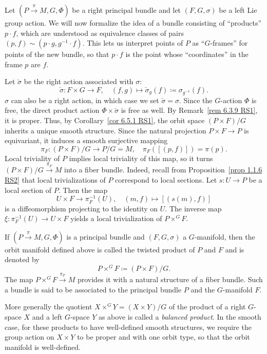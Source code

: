 Let $(P\overset{\pi}{\to}M,G,\Phi)$ be a right principal bundle and let $(F,G,\sigma)$ be a left Lie group action. We will now formalize the idea of a bundle consisting of ``products'' $p\cdot f$, which are understood as equivalence classes of pairs $(p,f)\sim (p\cdot g,g^{-1}\cdot f)$. This lets us interpret points of $P$ as ``$G$-frames'' for points of the new bundle, so that $p\cdot f$ is the point whose ``coordinates'' in the frame $p$ are $f$. 

Let $\check\sigma$ be the right action associated with $\sigma$:
\[\check\sigma:F\times G\to F,\quad (f,g)\mapsto \check{\sigma}_g(f)\coloneqq \sigma_{g^{-1}}(f).\]
$\sigma$ can also be a right action, in which case we set $\check\sigma=\sigma$. Since the $G$-action $\Phi$ is free, the direct product action $\Phi\times \check\sigma$ is free as well. By Remark~\ref{rem 6.3.9 RS1}, it is proper. Thus, by Corollary~\ref{cor 6.5.1 RS1}, the orbit space $(P\times F)\slash G$ inherits a unique smooth structure. Since the natural projection $P\times F\to P$ is equivariant, it induces a smooth surjective mapping
\[\pi_F:(P\times F)\slash G\to P\slash G=M,\quad \pi_F([(p,f)])=\pi(p).\]
Local triviality of $P$ implies local triviality of this map, so it turns $(P\times F)\slash G \overset{\pi_F}{\to } M$ into a fiber bundle. Indeed, recall from Proposition~\ref{prop 1.1.6 RS2} that local trivializations of $P$ correspond to local sections. Let $s:U\to P$ be a local section of $P$. Then the map
\[U\times F\to \pi_F^{-1}(U),\quad (m,f)\mapsto [(s(m),f)]\]
is a diffeomorphism projecting to the identity on $U$. The inverse map $\xi:\pi_F^{-1}(U)\to U\times F$ yields a local trivialization of $P\times^G F$.

\begin{defn}
    If $(P\overset{\pi}{\to}M,G,\Phi)$ is a principal bundle and  $(F,G,\sigma)$ a $G$-manifold, then the orbit manifold defined above is called the twisted product of $P$ and $F$ and is denoted by
    \[P\times^G F\coloneqq (P\times F)\slash G.\]
    The map $P\times^G F\overset{\pi_F}{\to } M$ provides it with a natural structure of a fiber bundle. Such a bundle is said to be associated to the principal bundle $P$ and the $G$-manifold $F$.
\end{defn}

More generally the quotient $X\times^G Y=(X\times Y)\slash G$ of the product of a right $G$-space $X$ and a left $G$-space $Y$ as above is called a \emph{balanced product}. In the smooth case, for these products to have well-defined smooth structures, we require the group action on $X\times Y$ to be proper and with one orbit type, so that the orbit manifold is well-defined.

